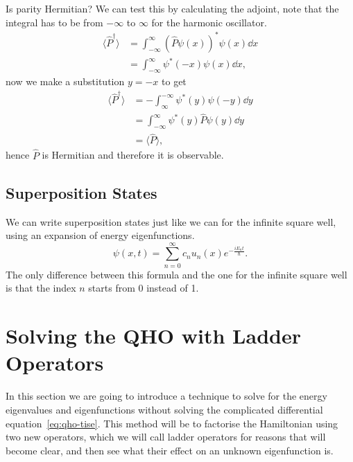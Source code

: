 \documentclass[../quantum_mechanics.tex]{subfiles}
\begin{document}
            Is parity Hermitian?
            We can test this by calculating the adjoint, note that the integral has to be from $-\infty$ to $\infty$ for the harmonic oscillator.
            \begin{align}
                \langle\hat{P}^\dagger\rangle&=\int_{-\infty}^\infty(\hat{P}\psi(x))^\ast\psi(x)\dd{x}\\
                &=\int_{-\infty}^\infty\psi^\ast(-x)\psi(x)\dd{x},
            \end{align}
            now we make a substitution $y=-x$ to get
            \begin{align}
                \langle\hat{P}^\dagger\rangle&=-\int_\infty^{-\infty}\psi^\ast(y)\psi(-y)\dd{y}\\
                &=\int_{-\infty}^\infty\psi^\ast(y)\hat{P}\psi(y)\dd{y}\\
                &=\langle\hat{P}\rangle,
            \end{align}
            hence $\hat{P}$ is Hermitian and therefore it is observable.

        \subsection{Superposition States}\label{chap:quantum-harmonic-oscillator:sec:energy-eigenstates:subsec:superposition-states}
            We can write superposition states just like we can for the infinite square well, using an expansion of energy eigenfunctions.
            \begin{equation}
                \psi(x,t)=\sum_{n=0}^\infty c_nu_n(x)e^{-\frac{iE_nt}{\hbar}}.
            \end{equation}
            The only difference between this formula and the one for the infinite square well is that the index $n$ starts from 0 instead of 1.

    \section{Solving the QHO with Ladder Operators}\label{sec:solving-the-qho-with-ladder-operators}
        In this section we are going to introduce a technique to solve for the energy eigenvalues and eigenfunctions without solving the complicated differential equation~\ref{eq:qho-tise}.
        This method will be to factorise the Hamiltonian using two new operators, which we will call ladder operators for reasons that will become clear, and then see what their effect on an unknown eigenfunction is.
\end{document}
